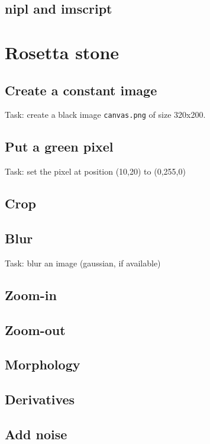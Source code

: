 \subsection{nipl and imscript}


\section{Rosetta stone}

\subsection{Create a constant image}

Task: create a black image \verb+canvas.png+ of size 320x200.

\subsection{Put a green pixel}

Task: set the pixel at position (10,20) to (0,255,0)

\subsection{Crop}

\subsection{Blur}

Task: blur an image (gaussian, if available)

\subsection{Zoom-in}

\subsection{Zoom-out}

\subsection{Morphology}

\subsection{Derivatives}

\subsection{Add noise}


